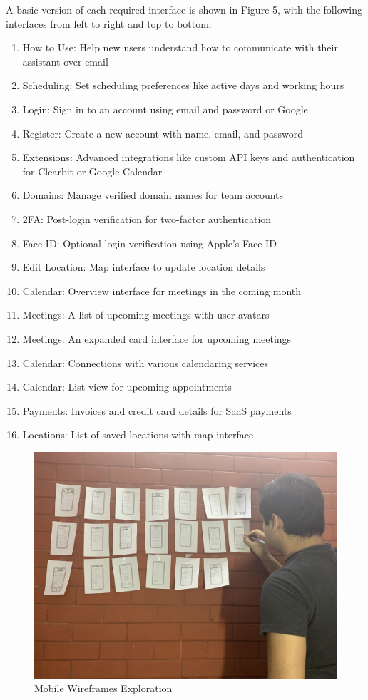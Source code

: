 \documentclass{article}
\begin{document}
 A basic version of each required interface is shown in Figure 5, with the following interfaces from left to right and top to bottom:
\begin{enumerate}
	\item How to Use: Help new users understand how to communicate with their assistant over email
	\item Scheduling: Set scheduling preferences like active days and working hours
	\item Login: Sign in to an account using email and password or Google
	\item Register: Create a new account with name, email, and password
	\item Extensions: Advanced integrations like custom API keys and authentication for Clearbit or Google Calendar
	\item Domains: Manage verified domain names for team accounts
	\item 2FA: Post-login verification for two-factor authentication
	\item Face ID: Optional login verification using Apple's Face ID
	\item Edit Location: Map interface to update location details
	\item Calendar: Overview interface for meetings in the coming month
	\item Meetings: A list of upcoming meetings with user avatars
	\item Meetings: An expanded card interface for upcoming meetings
	\item Calendar: Connections with various calendaring services
	\item Calendar: List-view for upcoming appointments
	\item Payments: Invoices and credit card details for SaaS payments
	\item Locations: List of saved locations with map interface
\end{enumerate}

\begin{figure}\centering
	\includegraphics[scale=0.035]{ideation-wall.jpg}
	\caption{Mobile Wireframes Exploration}
\end{figure}
\end{document}
